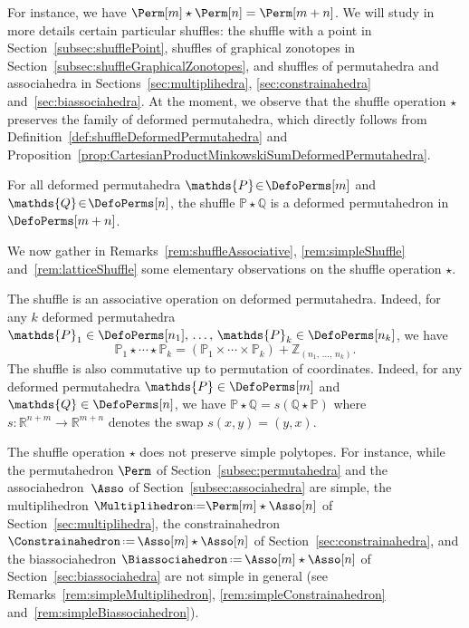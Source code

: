 \documentclass[AHL,Unicode,longabstracts,published]{cedram}
\newcommand{\R}{\mathbb{R}}
\newcommand{\eqdef}{\mbox{\,\raisebox{0.2ex}{\scriptsize\ensuremath{\mathrm:}}\ensuremath{=}\,}}
\newcommand{\shuffleDP}{\star} %
\newcommand{\polytope}[1]{\mathds{#1}}
\begin{document}
For instance, we have $\Perm[m] \shuffleDP \Perm[n] = \Perm[m+n]$. We will study in more details certain particular shuffles: the shuffle with a point in Section~\ref{subsec:shufflePoint}, shuffles of graphical zonotopes in Section~\ref{subsec:shuffleGraphicalZonotopes}, and shuffles of permutahedra and associahedra in Sections~\ref{sec:multiplihedra}, \ref{sec:constrainahedra} and~\ref{sec:biassociahedra}. At the moment, we observe that the shuffle operation $\shuffleDP$ preserves the family of deformed permutahedra, which directly follows from Definition~\ref{def:shuffleDeformedPermutahedra} and Proposition~\ref{prop:CartesianProductMinkowskiSumDeformedPermutahedra}.

\begin{prop}\label{prop:shuffleDeformedPermutahedra}
For all deformed permutahedra $\polytope{P} \!\in\! \DefoPerms[m]$ and ${\polytope{Q} \!\in\! \DefoPerms[n]}$, the shuffle $\polytope{P} \shuffleDP \polytope{Q}$ is a deformed permutahedron in $\DefoPerms[m+n]$.
\end{prop}

We now gather in Remarks~\ref{rem:shuffleAssociative}, \ref{rem:simpleShuffle} and~\ref{rem:latticeShuffle} some elementary observations on the shuffle operation $\shuffleDP$.

\begin{rema}\label{rem:shuffleAssociative}
The shuffle is an associative operation on deformed permutahedra. Indeed, for any $k$ deformed permutahedra $\polytope{P}_1 \in \DefoPerms[n_1],\, \dots,\, \polytope{P}_k \in \DefoPerms[n_k]$, we have
\[
\polytope{P}_1 \shuffleDP \cdots \shuffleDP \polytope{P}_k = (\polytope{P}_1 \times \cdots \times \polytope{P}_k) + \polytope{Z}_{(n_1,\,\dots,\,n_k)}.
\]
The shuffle is also commutative up to permutation of coordinates. Indeed, for any deformed permutahedra $\polytope{P} \in \DefoPerms[m]$ and $\polytope{Q} \in \DefoPerms[n]$, we have $\polytope{P} \shuffleDP \polytope{Q} = s(\polytope{Q} \shuffleDP \polytope{P})$ where $s : \R^{n+m} \to \R^{m+n}$ denotes the swap $s(x,y) = (y, x)$.
\end{rema}

\begin{rema}\label{rem:simpleShuffle}
The shuffle operation $\shuffleDP$ does not preserve simple polytopes. For instance, while the permutahedron $\Perm$ of Section~\ref{subsec:permutahedra} and the associahedron~$\Asso$ of Section~\ref{subsec:associahedra} are simple, the multiplihedron $\Multiplihedron \!\eqdef\! \Perm[m] \shuffleDP \Asso[n]$ of Section~\ref{sec:multiplihedra}, the constrainahedron ${\Constrainahedron \eqdef \Asso[m] \shuffleDP \Asso[n]}$ of Section~\ref{sec:constrainahedra}, and the biassociahedron $\Biassociahedron \eqdef \Asso[m] \shuffleDP \Asso[n]$ of Section~\ref{sec:biassociahedra} are not simple in general (see Remarks~\ref{rem:simpleMultiplihedron}, \ref{rem:simpleConstrainahedron} and~\ref{rem:simpleBiassociahedron}).
\end{rema}
\end{document}
